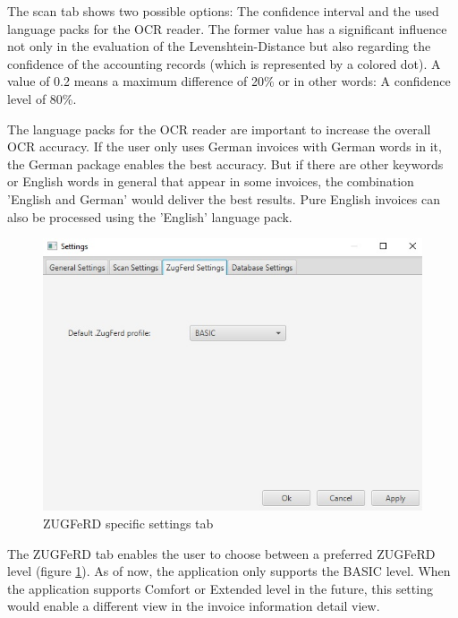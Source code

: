 The scan tab shows two possible options: The confidence interval and the used language packs for the OCR reader. The former value has a significant influence not only in the evaluation of the Levenshtein-Distance but also regarding the confidence of the accounting records (which is represented by a colored dot). A value of 0.2 means a maximum difference of 20\% or in other words: A confidence level of 80\%.

The language packs for the OCR reader are important to increase the overall OCR accuracy. If the user only uses German invoices with German words in it, the German package enables the best accuracy. But if there are other keywords or English words in general that appear in some invoices, the combination 'English and German' would deliver the best results. Pure English invoices can also be processed using the 'English' language pack.

\begin{figure}[ht!]
\centering
\includegraphics[scale=0.6]{Images/GUI/settings_ZugFerd.jpg}
\caption{ZUGFeRD specific settings tab \label{settings_ZugFerd}}
\end{figure}

The ZUGFeRD tab enables the user to choose between a preferred ZUGFeRD level (figure \ref{settings_ZugFerd}). As of now, the application only supports the BASIC level. When the application supports Comfort or Extended level in the future, this setting would enable a different view in the invoice information detail view.


